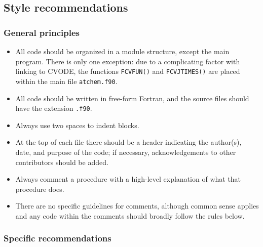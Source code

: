 \subsection{Style recommendations} \label{subsec:style-recommendations}

\subsubsection{General principles}

\begin{itemize}
\item All code should be organized in a module structure, except the
  main program. There is only one exception: due to a complicating
  factor with linking to CVODE, the functions \texttt{FCVFUN()} and
  \texttt{FCVJTIMES()} are placed within the main file
  \texttt{atchem.f90}.
\item All code should be written in free-form Fortran, and the source
  files should have the extension \texttt{.f90}.
\item Always use two spaces to indent blocks.
\item At the top of each file there should be a header indicating the
  author(s), date, and purpose of the code; if necessary,
  acknowledgements to other contributors should be added.
\item Always comment a procedure with a high-level explanation of what
  that procedure does.
\item There are no specific guidelines for comments, although common
  sense applies and any code within the comments should broadly follow
  the rules below.
\end{itemize}

\subsubsection{Specific recommendations}

